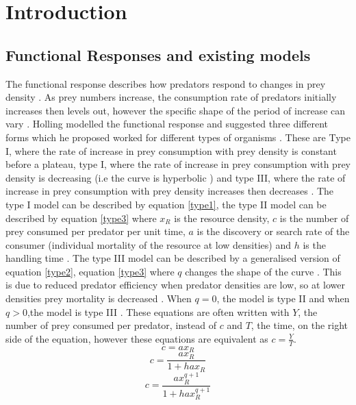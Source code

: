 \documentclass{article}
\begin{document}
\section{Introduction}
\subsection{Functional Responses and existing models}
The functional response describes how predators respond to changes in prey density \cite{hollingsawfly1959,Solomon1949}. As prey numbers increase, the consumption rate of predators initially increases then levels out, however the specific shape of the period of increase can vary \cite{hollingsawfly1959}. Holling modelled the functional response and suggested three different forms which he proposed worked for different types of organisms \cite{hollingsawfly1959}. These are Type I, where the rate of increase in prey consumption with prey density is constant before a plateau, type I, where the rate of increase in prey consumption with prey density is decreasing (i.e the curve is hyperbolic \cite{Jeschke2002PredatorPrey}) and type III, where the  rate of increase in prey consumption with prey density increases then decreases \cite{hollingsawfly1959}. The type I model can be described by equation \ref{type1}, the type II model can be described by equation \ref{type3} where $x_R$ is the resource density, $c$ is the number of prey consumed per predator per unit time, $a$ is the discovery or search rate of the consumer (individual mortality of the resource at low densities\cite{Englund2011TemperatureResponse}) and $h$ is the handling time \cite{Dawes2013,Holling1959}. The type III model can be described by a generalised version of equation \ref{type2}, equation \ref{type3} where $q$ changes the shape of the curve \cite{Dawes2013}. This is due to reduced predator efficiency when predator densities are low, so at lower densities prey mortality is decreased \cite{Taylor2003EffectAmericanus,Hassell1978TheSystems.}. 
When $q=0$, the model is type II and when $q>0$,the model is type III \cite{Dawes2013}. These equations are often written with $Y$, the number of prey consumed per predator, instead of $c$ and $T$, the time, on the right side of the equation, however these equations are equivalent as $c=\frac{Y}{T}$.
\begin{equation}\label{type1}
    c=ax_R
\end{equation}
\begin{equation}\label{type2}
c=\frac{ax_R}{1+hax_R}
\end{equation}
\begin{equation}\label{type3}
c=\frac{ax_R^{q+1}}{1+hax_R^{q+1}}
\end{equation}
\end{document}

